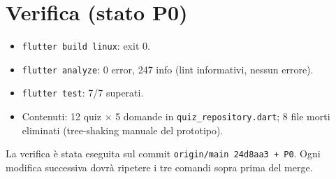 \chapter{Verifica (stato P0)}
\label{ch:verifica}

\begin{itemize}
\item \texttt{flutter build linux}: exit 0.
\item \texttt{flutter analyze}: 0 error, 247 info (lint informativi, nessun errore).
\item \texttt{flutter test}: 7/7 superati.
\item Contenuti: 12 quiz $\times$ 5 domande in \texttt{quiz\_repository.dart};
8 file morti eliminati (tree-shaking manuale del prototipo).
\end{itemize}
La verifica è stata eseguita sul commit \texttt{origin/main 24d8aa3 + P0}.
Ogni modifica successiva dovrà ripetere i tre comandi sopra prima del merge.
